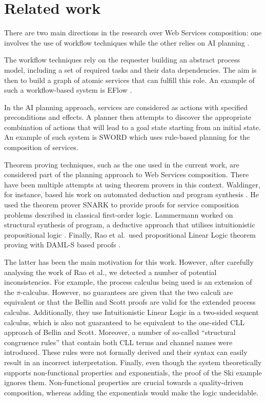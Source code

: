 \documentclass[copyright,creativecommons]{eptcs}
\begin{document}
\section{Related work}
\label{relatedwork}

There are two main directions in the research over Web Services composition: one involves the use of workflow techniques while the other relies on AI planning \cite{hendler1990ai}. 

The workflow techniques rely on the requester building an abstract process model, including a set of required tasks and their data dependencies. The aim is then to build a graph of atomic services that can fulfill this role. An example of such a workflow-based system is EFlow \cite{casati2000eflow}. 

In the AI planning approach, services are considered as actions with specified preconditions and effects. A planner then attempts to discover the appropriate combination of actions that will lead to a goal state starting from an initial state. An example of such system is SWORD \cite{ponnekanti2002sword} which uses rule-based planning for the composition of services.

Theorem proving techniques, such as the one used in the current work, are considered part of the planning approach to Web Services composition. There have been multiple attempts at using theorem provers in this context. Waldinger, for instance, based his work on automated deduction and program synthesis \cite{waldinger2001wac}. He used the theorem prover SNARK \cite{stickel2000guide} to provide proofs for service composition problems described in classical first-order logic. Lammermann worked on structural synthesis of program, a deductive approach that utilises intuitionistic propositional logic \cite{lammermann2002rsc}. Finally, Rao et al.\ used propositional Linear Logic theorem proving with DAML-S based proofs \cite{rao-semantic,rao2006composition}. 

The latter has been the main motivation for this work. However, after carefully analysing the work of Rao et al., we detected a number of potential inconsistencies. For example, the process calculus being used is an extension of the $\pi$-calculus. However, no guarantees are given that the two calculi are equivalent or that the Bellin and Scott proofs are valid for the extended process calculus. Additionally, they use Intuitionistic Linear Logic in a two-sided sequent calculus, which is also not guaranteed to be equivalent to the one-sided CLL approach of Bellin and Scott. Moreover, a number of so-called ``structural congruence rules'' that contain both CLL terms and channel names were introduced. These rules were not formally derived and their syntax can easily result in an incorrect interpretation. Finally, even though the system theoretically supports non-functional properties and exponentials, the proof of the Ski example ignores them. Non-functional properties are crucial towards a quality-driven composition, whereas adding the exponentials would make the logic undecidable. 
\end{document}
